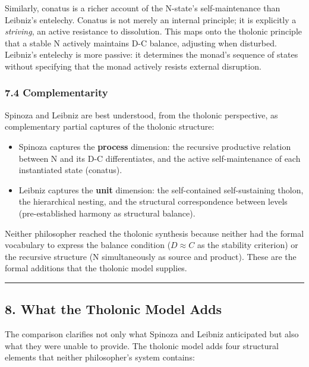 \documentclass[
  11pt,
  letterpaper,
]{article}
\providecommand{\tightlist}{%
  \setlength{\itemsep}{0pt}\setlength{\parskip}{0pt}}
\begin{document}
Similarly, conatus is a richer account of the N-state's self-maintenance
than Leibniz's entelechy. Conatus is not merely an internal principle;
it is explicitly a \emph{striving}, an active resistance to dissolution.
This maps onto the tholonic principle that a stable N actively maintains
D-C balance, adjusting when disturbed. Leibniz's entelechy is more
passive: it determines the monad's sequence of states without specifying
that the monad actively resists external disruption.

\subsubsection{7.4 Complementarity}\label{complementarity}

Spinoza and Leibniz are best understood, from the tholonic perspective,
as complementary partial captures of the tholonic structure:

\begin{itemize}
\tightlist
\item
  Spinoza captures the \textbf{process} dimension: the recursive
  productive relation between N and its D-C differentiates, and the
  active self-maintenance of each instantiated state (conatus).
\item
  Leibniz captures the \textbf{unit} dimension: the self-contained
  self-sustaining tholon, the hierarchical nesting, and the structural
  correspondence between levels (pre-established harmony as structural
  balance).
\end{itemize}

Neither philosopher reached the tholonic synthesis because neither had
the formal vocabulary to express the balance condition (\(D \approx C\)
as the stability criterion) or the recursive structure (N simultaneously
as source and product). These are the formal additions that the tholonic
model supplies.

\begin{center}\rule{0.5\linewidth}{0.5pt}\end{center}

\subsection{8. What the Tholonic Model
Adds}\label{what-the-tholonic-model-adds}

The comparison clarifies not only what Spinoza and Leibniz anticipated
but also what they were unable to provide. The tholonic model adds four
structural elements that neither philosopher's system contains:
\end{document}
